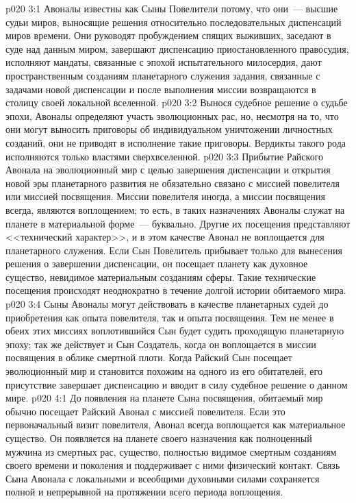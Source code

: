 \vs p020 3:1 Авоналы известны как Сыны Повелители потому, что они~--- высшие судьи миров, выносящие решения относительно последовательных диспенсаций миров времени. Они руководят пробуждением спящих выживших, заседают в суде над данным миром, завершают диспенсацию приостановленного правосудия, исполняют мандаты, связанные с эпохой испытательного милосердия, дают пространственным созданиям планетарного служения задания, связанные с задачами новой диспенсации и после выполнения миссии возвращаются в столицу своей локальной вселенной.
\vs p020 3:2 Вынося судебное решение о судьбе эпохи, Авоналы определяют участь эволюционных рас, но, несмотря на то, что они могут выносить приговоры об индивидуальном уничтожении личностных созданий, они не приводят в исполнение такие приговоры. Вердикты такого рода исполняются только властями сверхвселенной.
\vs p020 3:3 Прибытие Райского Авонала на эволюционный мир с целью завершения диспенсации и открытия новой эры планетарного развития не обязательно связано с миссией повелителя или миссией посвящения. Миссии повелителя иногда, а миссии посвящения всегда, являются воплощением; то есть, в таких назначениях Авоналы служат на планете в материальной форме~--- буквально. Другие их посещения представляют <<технический характер>>, и в этом качестве Авонал не воплощается для планетарного служения. Если Сын Повелитель прибывает только для вынесения решения о завершении диспенсации, он посещает планету как духовное существо, невидимое материальным созданиям сферы. Такие технические посещения происходят неоднократно в течение долгой истории обитаемого мира.
\vs p020 3:4 Сыны Авоналы могут действовать в качестве планетарных судей до приобретения как опыта повелителя, так и опыта посвящения. Тем не менее в обеих этих миссиях воплотившийся Сын будет судить проходящую планетарную эпоху; так же действует и Сын Создатель, когда он воплощается в миссии посвящения в облике смертной плоти. Когда Райский Сын посещает эволюционный мир и становится похожим на одного из его обитателей, его присутствие завершает диспенсацию и вводит в силу судебное решение о данном мире.
\vs p020 4:1 До появления на планете Сына посвящения, обитаемый мир обычно посещает Райский Авонал с миссией повелителя. Если это первоначальный визит повелителя, Авонал всегда воплощается как материальное существо. Он появляется на планете своего назначения как полноценный мужчина из смертных рас, существо, полностью видимое смертным созданиям своего времени и поколения и поддерживает с ними физический контакт. Связь Сына Авонала с локальными и всеобщими духовными силами сохраняется полной и непрерывной на протяжении всего периода воплощения.
